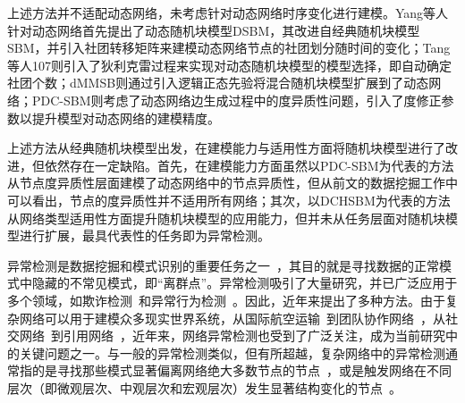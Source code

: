 上述方法并不适配动态网络，未考虑针对动态网络时序变化进行建模。Yang等人针对动态网络首先提出了动态随机块模型DSBM\cite{yang2011detecting}，其改进自经典随机块模型SBM，并引入社团转移矩阵来建模动态网络节点的社团划分随时间的变化；Tang等人107则引入了狄利克雷过程来实现对动态随机块模型的模型选择，即自动确定社团个数；dMMSB\cite{xing2010state}则通过引入逻辑正态先验将混合随机块模型扩展到了动态网络；PDC-SBM\cite{riverain2023poisson}则考虑了动态网络边生成过程中的度异质性问题，引入了度修正参数以提升模型对动态网络的建模精度。

上述方法从经典随机块模型出发，在建模能力与适用性方面将随机块模型进行了改进，但依然存在一定缺陷。首先，在建模能力方面虽然以PDC-SBM为代表的方法从节点度异质性层面建模了动态网络中的节点异质性，但从前文的数据挖掘工作中可以看出，节点的度异质性并不适用所有网络；其次，以DCHSBM为代表的方法从网络类型适用性方面提升随机块模型的应用能力，但并未从任务层面对随机块模型进行扩展，最具代表性的任务即为异常检测。


异常检测是数据挖掘和模式识别的重要任务之一~\cite{chandola2009anomaly,zenati2018adversarially}，其目的就是寻找数据的正常模式中隐藏的不常见模式，即“离群点”。异常检测吸引了大量研究，并已广泛应用于多个领域，如欺诈检测~\cite{ahmed2016survey}和异常行为检测~\cite{amraee2018anomaly}。因此，近年来提出了多种方法。由于复杂网络可以用于建模众多现实世界系统，从国际航空运输~\cite{kasai2016network}到团队协作网络~\cite{zhou2019towards}，从社交网络~\cite{lv2017social}到引用网络~\cite{ley2002dblp}，近年来，网络异常检测也受到了广泛关注，成为当前研究中的关键问题之一。与一般的异常检测类似，但有所超越，复杂网络中的异常检测通常指的是寻找那些模式显著偏离网络绝大多数节点的节点~\cite{ding2019interactive,ding2020inductive}，或是触发网络在不同层次（即微观层次、中观层次和宏观层次）发生显著结构变化的节点~\cite{ranshous2015anomaly}。



